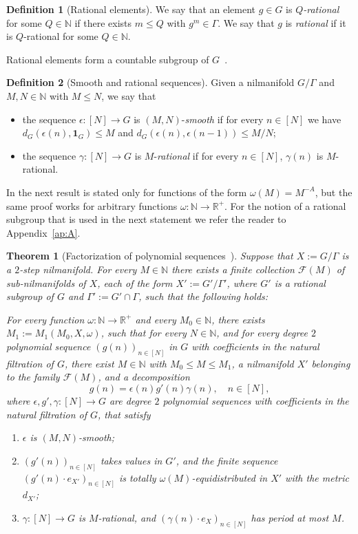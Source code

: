 \documentclass[11pt]{amsart}
\newtheorem{theorem}[lemma]{Theorem}
\theoremstyle{definition}
\newtheorem*{definition}{Definition}
\begin{document}
\begin{definition}[Rational elements]
We say that an element $g\in G$ is \emph{$Q$-rational} for some
$Q\in {{\mathbb N}}$ if there exists $m\leq Q$ with $g^m \in\Gamma$. We say
that $g$ is \emph{rational} if it is $Q$-rational for some $Q\in
{{\mathbb N}}$.
\end{definition}
Rational elements form a countable subgroup of $G$~\cite[Lemma A.12]{GT12a}.
\begin{definition}[Smooth and rational sequences]
Given a nilmanifold $G/\Gamma$ and $M,N\in {{\mathbb N}}$ with $M\leq N$,  we
say that
\begin{itemize}
\item
 the sequence   $\epsilon\colon[N]\to G$
is $(M,N)$-\emph{smooth} if for every $n\in[N]$ we have
$d_G(\epsilon(n), {\mathbf{1}}_G)\leq M$
and $d_G(\epsilon(n),\epsilon(n-1))\leq M/N$;
\item
 the sequence $\gamma\colon[N]\to G$ is $M$-\emph{rational} if
 for every $n\in[N]$, $\gamma(n)$ is $M$-rational.
\end{itemize}
 \end{definition}
In \cite{GT12a} the next result is stated only for functions of the
form $\omega(M)=M^{-A}$, but the same proof  works for arbitrary
functions $\omega\colon {{\mathbb N}}\to{{\mathbb R}}^+$.  For the notion of a rational
subgroup that is used in the next statement we refer the reader to
Appendix~\ref{ap:A}.
\begin{theorem}[Factorization of polynomial sequences~{\cite[Theorem~1.19]{GT12a}}]
\label{th:factorization}
 Suppose that   $X:=G/\Gamma$ is a $2$-step
nilmanifold. For every $M\in{{\mathbb N}}$ there exists a finite
collection ${{\mathcal F}}(M)$ of sub-nilmanifolds of $X$, each of the form
$X':=G'/\Gamma'$, where $G'$ is a rational subgroup of $G$ and
$\Gamma':=G'\cap\Gamma$, such that the following holds:

 For every function 
 $\omega\colon {{\mathbb N}}\to{{\mathbb R}}^+$ and every $M_0\in {{\mathbb N}}$, there exists  $M_1:=M_1(M_0,X,\omega)$, such
that for every $N\in{{\mathbb N}}$, and for every
 degree $2$ polynomial sequence
$(g(n))_{n\in[N]}$ in $G$  with  coefficients in the natural
filtration of $G$, there exist   $M\in {{\mathbb N}}$ with $M_0\leq M\leq M_1$,
a nilmanifold $X'$ belonging to the family ${{\mathcal F}}(M)$, and a
decomposition
$$
g(n) = \epsilon(n) g'(n)\gamma(n), \quad n\in [N],
$$
 where $\epsilon,g',\gamma\colon [N]\to G$ are
degree $2$ polynomial sequences with coefficients in the natural
filtration of $G$, that satisfy
\begin{enumerate}
\item
\label{it:smooth} $\epsilon$ is $(M,N)$-smooth;
\item
\label{it:equid} $(g'(n))_{n\in[N]}$ takes values in $G'$, and the
finite sequence $(g'(n)\cdot e_{X'})_{n\in[N]}$ is totally
$\omega(M)$-equidistributed in $X'$ with the metric $d_{X'}$;
\item
\label{it:periodic} $\gamma\colon [N]\to G$  is $M$-rational, and
$(\gamma(n)\cdot e_X)_{n\in [N]}$ has period at most $M$.
\end{enumerate}
\end{theorem}
\end{document}
